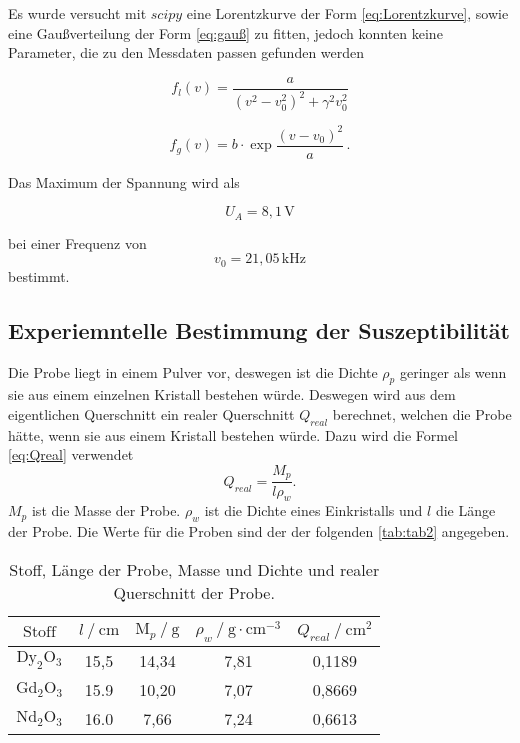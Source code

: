 Es wurde versucht mit $ scipy$ eine Lorentzkurve der Form \eqref{eq:Lorentzkurve}, sowie eine Gaußverteilung der Form \eqref{eq:gauß} zu fitten, jedoch konnten keine Parameter, die zu den Messdaten passen gefunden werden

\begin{equation}
    f_l(v) = \frac{a}{(v^2-v_0^2)^2 + {\gamma}^2 v_0^2}
    \label{eq:Lorentzkurve}
\end{equation}

\begin{equation}
    f_g(v) = b \cdot \exp{\frac{(v-v_0)^2}{a}} \,.
    \label{eq:gauß}
\end{equation} 

Das Maximum der Spannung wird als

\begin{equation}
    U_A = 8,1 \, \unit{\volt}
\end{equation}

bei einer Frequenz von 
\begin{equation}
    v_0 = 21,05 \, \unit{\kilo\hertz}
\end{equation}
bestimmt.

\subsection{Experiemntelle Bestimmung der Suszeptibilität}

Die Probe liegt in einem Pulver vor, deswegen ist die Dichte $ \rho_p$ geringer als wenn sie aus einem einzelnen Kristall bestehen würde.
Deswegen wird aus dem eigentlichen Querschnitt ein realer Querschnitt $Q_{real} $ berechnet, welchen die Probe hätte, wenn sie aus einem Kristall bestehen würde.
Dazu wird die Formel \eqref{eq:Qreal} verwendet
\begin{equation}
    Q_{real} = \frac{M_p}{l \rho_w} .
    \label{eq:Qreal}
\end{equation}
$M_p$ ist die Masse der Probe. $\rho_w$ ist die Dichte eines Einkristalls und $l$ die Länge der Probe.
Die Werte für die Proben sind der der folgenden \autoref{tab:tab2} angegeben.


\begin{table}[H]
    \centering
    \caption{Stoff, Länge der Probe, Masse und Dichte und realer Querschnitt der Probe.}
    \label{tab:tab2}
    \begin{tabular}{S S S S S}
      \toprule
        {$\text{Stoff}$}&{$l \mathbin{/} \unit{\centi\meter} $}&{$\text{M}_p \mathbin{/} \unit{\gram} $}&{$ \rho_w \mathbin{/} \unit{\gram} \cdot \unit{\centi\meter}^{-3}$}&{$Q_{real} \mathbin{/} \unit{\centi\meter}^{2}$}\\
        \midrule
        {$\text{Dy}_2 \text{O}_3$} & {15,5}& {14,34}&{7,81}&{0,1189}\\
        {$\text{Gd}_2 \text{O}_3$} & {15.9}& {10,20}&{7,07}&{0,8669}\\
        {$\text{Nd}_2 \text{O}_3$} & {16.0}& {7,66} &{7,24}&{0,6613}\\
      \bottomrule
    \end{tabular}
\end{table}


